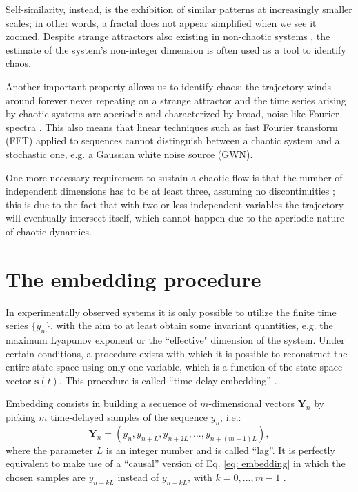 Self-similarity, instead, is the exhibition of similar patterns at increasingly smaller
scales; in other words, a fractal does not appear simplified when we see it zoomed. Despite strange attractors
also existing in non-chaotic systems \cite{ref:strange_attractors_non_chaotic}, the estimate of the system's non-integer dimension
is often used as a tool to identify chaos.

Another important property allows
us to identify chaos: the trajectory winds around forever never repeating on a
strange attractor and the time series arising by chaotic systems are aperiodic
and characterized by broad, noise-like Fourier spectra \cite{ref:abarbanel_fourier_spectra}.
This also means that linear techniques
such as fast Fourier transform (FFT) applied to sequences cannot distinguish between a chaotic system
and a stochastic one, e.g. a Gaussian white noise source (GWN).

One more necessary requirement to sustain a chaotic flow is that
the number of independent dimensions has to be at least three, assuming no discontinuities \cite{ref:chaos_two_dim_theorem};
this is due to the fact that
with two or less independent variables the trajectory will eventually intersect itself, which
cannot happen due to the aperiodic nature of chaotic dynamics.


\section{The embedding procedure}
\label{sec: embedding}

In experimentally observed systems it is only possible to utilize the finite time series $\{y_n\}$,
with the aim to at least obtain some invariant quantities, e.g. the maximum Lyapunov exponent or
the ``effective" dimension of the system. Under certain conditions, a procedure exists with which
it is possible to reconstruct the entire state space using only one variable, which is a
function of the state space vector $\mathbf{s}(t)$. This procedure is called ``time delay embedding''
\cite{ref:packard1980geometry}.

Embedding consists in building a sequence of $m$-dimensional vectors $\mathbf{Y}_n$ by picking
$m$ time-delayed samples of the sequence $y_n$, i.e.:
\begin{equation}
    \label{eq: embedding}
    \mathbf{Y}_n=\left(y_n,y_{n+L},y_{n+2L},...,y_{n+(m-1)L}\right),
\end{equation}
where the parameter $L$ is an integer number and is called ``lag''. It is perfectly equivalent to make use of
a ``causal'' version of Eq. \ref{eq: embedding} in which the chosen samples are $y_{n-kL}$ instead of
$y_{n+kL}$, with $k=0,...,m-1$ \cite{ref:bradley2015nonlinear}. 

